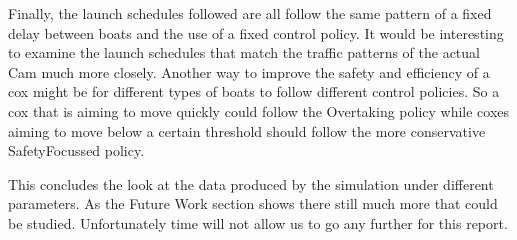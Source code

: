 Finally, the launch schedules followed are all follow the same pattern of a fixed delay between boats and the use of a fixed control policy. It would be interesting to examine the launch schedules that match the traffic patterns of the actual Cam much more closely. Another way to improve the safety and efficiency of a cox might be for different types of boats to follow different control policies. So a cox that is aiming to move quickly could follow the Overtaking policy while coxes aiming to move below a certain threshold should follow the more conservative SafetyFocussed policy.

This concludes the look at the data produced by the simulation under different parameters. As the Future Work section shows there still much more that could be studied. Unfortunately time will not allow us to go any further for this report.